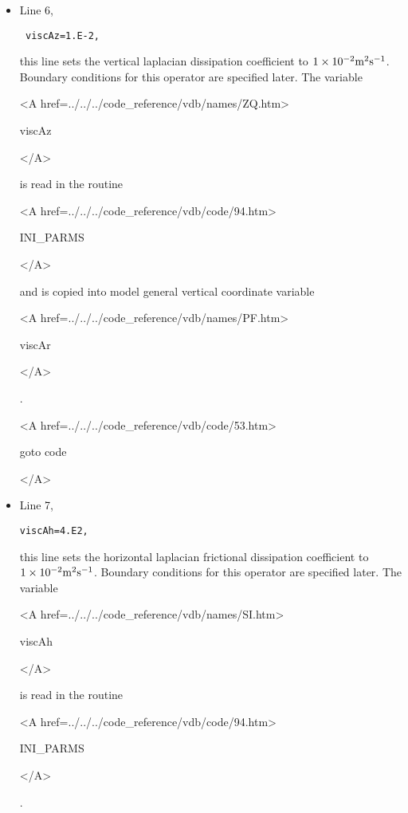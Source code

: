 \begin{itemize}
\item Line 6, 
\begin{verbatim} viscAz=1.E-2, \end{verbatim} 
this line sets the vertical laplacian dissipation coefficient to
$1 \times 10^{-2} {\rm m^{2}s^{-1}}$. Boundary conditions
for this operator are specified later. 
The variable 
{\bf 
\begin{rawhtml} <A href=../../../code_reference/vdb/names/ZQ.htm> \end{rawhtml}
viscAz
\begin{rawhtml} </A>\end{rawhtml}
}
is read in the routine
{\it
\begin{rawhtml} <A href=../../../code_reference/vdb/code/94.htm> \end{rawhtml}
INI\_PARMS
\begin{rawhtml} </A>\end{rawhtml}
}
and is copied into model general vertical coordinate variable 
{\bf 
\begin{rawhtml} <A href=../../../code_reference/vdb/names/PF.htm> \end{rawhtml}
viscAr
\begin{rawhtml} </A>\end{rawhtml}
}.

{\bf
\begin{rawhtml} <A href=../../../code_reference/vdb/code/53.htm> \end{rawhtml}
goto code
\begin{rawhtml} </A>\end{rawhtml}
}

\item Line 7, 
\begin{verbatim}
viscAh=4.E2,
\end{verbatim} 
this line sets the horizontal laplacian frictional dissipation coefficient to
$1 \times 10^{-2} {\rm m^{2}s^{-1}}$. Boundary conditions
for this operator are specified later.
The variable 
{\bf 
\begin{rawhtml} <A href=../../../code_reference/vdb/names/SI.htm> \end{rawhtml}
viscAh
\begin{rawhtml} </A>\end{rawhtml}
}
is read in the routine
{\it
\begin{rawhtml} <A href=../../../code_reference/vdb/code/94.htm> \end{rawhtml}
INI\_PARMS
\begin{rawhtml} </A>\end{rawhtml}
}.


\end{itemize}
